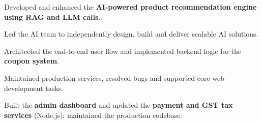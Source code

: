 \documentclass[10pt]{article}
\begin{document}
\begin{rkbody}
\begin{rkitems}
  \item Developed and enhanced the \textbf{AI-powered product recommendation engine using RAG and LLM calls}.
  \item Led the AI team to independently design, build and deliver scalable AI solutions.
  \item Architected the end-to-end user flow and implemented backend logic for the \textbf{coupon system}.
  \item Maintained production services, resolved bugs and supported core web development tasks.
\end{rkitems}
\begin{rkitems}
  \item Built the \textbf{admin dashboard} and updated the \textbf{payment and GST tax services} (Node.js); maintained the production codebase.
\end{rkitems}


\end{rkbody}
\end{document}
